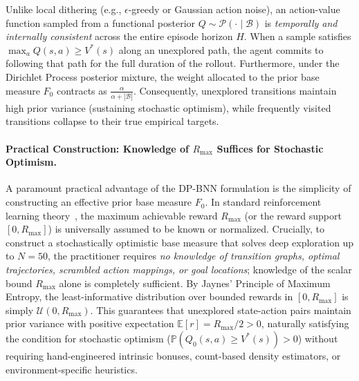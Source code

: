 \documentclass[10pt]{article}
\begin{document}
Unlike local dithering (e.g., $\epsilon$-greedy or Gaussian action noise), an action-value function sampled from a functional posterior $Q \sim \mathcal{P}(\cdot \mid \mathcal{B})$ is \emph{temporally and internally consistent} across the entire episode horizon $H$. When a sample satisfies $\max_a Q(s, a) \ge V^*(s)$ along an unexplored path, the agent commits to following that path for the full duration of the rollout. Furthermore, under the Dirichlet Process posterior mixture, the weight allocated to the prior base measure $F_0$ contracts as $\frac{\alpha}{\alpha + |\mathcal{B}|}$. Consequently, unexplored transitions maintain high prior variance (sustaining stochastic optimism), while frequently visited transitions collapse to their true empirical targets.

\paragraph{Practical Construction: Knowledge of \texorpdfstring{$R_{\max}$}{R\_max} Suffices for Stochastic Optimism.}
A paramount practical advantage of the DP-BNN formulation is the simplicity of constructing an effective prior base measure $F_0$. In standard reinforcement learning theory~\citep{brafman2002r, strehl2008analysis, osband2013more}, the maximum achievable reward $R_{\max}$ (or the reward support $[0, R_{\max}]$) is universally assumed to be known or normalized. Crucially, to construct a stochastically optimistic base measure that solves deep exploration up to $N=50$, the practitioner requires \emph{no knowledge of transition graphs, optimal trajectories, scrambled action mappings, or goal locations}; knowledge of the scalar bound $R_{\max}$ alone is completely sufficient. By Jaynes' Principle of Maximum Entropy, the least-informative distribution over bounded rewards in $[0, R_{\max}]$ is simply $\mathcal{U}(0, R_{\max})$. This guarantees that unexplored state-action pairs maintain prior variance with positive expectation $\mathbb{E}[r] = R_{\max}/2 > 0$, naturally satisfying the condition for stochastic optimism ($\mathbb{P}(Q_0(s, a) \ge V^*(s)) > 0$) without requiring hand-engineered intrinsic bonuses, count-based density estimators, or environment-specific heuristics.
\end{document}
